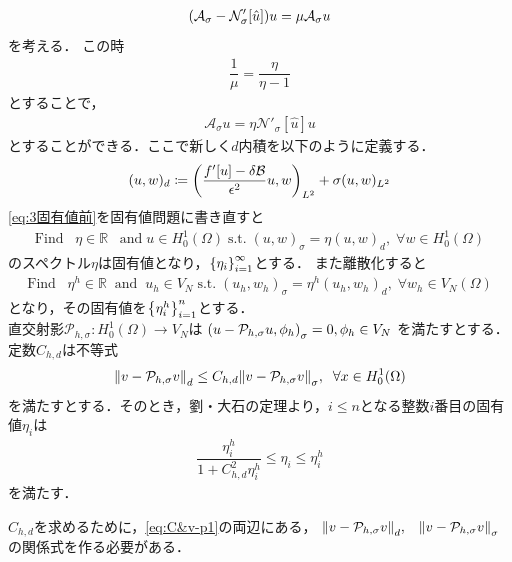 \begin{align}
  \qty(\mathcal{A}_\sigma  - \mathcal{N}'_\sigma  [\hat{u}])u =\mu \mathcal{A}_\sigma  u
\end{align}
を考える．
この時
\begin{align}
  \dfrac{1}{\mu} = \dfrac{\eta}{\eta - 1}
\end{align}
とすることで，
\begin{align}\label{eq:3固有値前}
  \mathcal{A}_\sigma  u = \eta \mathcal{N'}_\sigma [\hat{u}] u 
\end{align}
とすることができる．ここで新しく\(d\)内積を以下のように定義する．
\begin{align}
   (u,w)_d \coloneqq \qty(\dfrac{f'[u]-\delta \mathcal{B}}{\epsilon^2}u,w)_{L^2}+\sigma(u,w)_{L^2}
\end{align}
\eqref{eq:3固有値前}を固有値問題に書き直すと
\begin{align}
  \text{Find} \;\;\;\eta \in \mathbb{R}\;\;\; \text{and} \;u\in H^1_0(\Omega)\;\text{s.t.}\;(u,w)_{\sigma} = \eta (u,w)_d,\;\forall w \in H^1_0 (\Omega)
\end{align}
のスペクトル\(\eta\)は固有値となり，\(\qty{\eta_i}^\infty_{i=1}\)とする．
また離散化すると
\begin{align}
  \text{Find} \;\;\;\eta^h \in \mathbb{R} \;\;\text{and} \;\;u_h\in V_N\;\text{s.t.}\;(u_h,w_h)_{\sigma} = \eta^h (u_h,w_h)_d,\;\forall w_h \in V_N (\Omega)
\end{align}
となり，その固有値を\(\qty{\eta^h_i}^n_{i=1}\)とする．\\
直交射影\(\mathcal{P}_{h,\sigma }:H^1_0(\Omega)\rightarrow V_N\)は
\(\qty(u-\mathcal{P}_{h,\sigma }u , \phi_h)_{\sigma} = 0,\phi_h\in V_N\)
を満たすとする．定数\(C_{h,d }\)は不等式
\begin{align}\label{eq:C&v-p1}
  \norm{v-\mathcal{P}_{h,\sigma }v}_d \leq C_{h,d } \norm{v-\mathcal{P}_{h,\sigma }v}_{\sigma },
  \;\;\forall x \in H^1_0(\Omega)
\end{align}
を満たすとする．そのとき，劉・大石の定理より，\(i \leq n\)となる整数\(i\)番目の固有値\(\eta_i\)は
\begin{align}
  \dfrac{\eta^h_i}{1+C_{h,d}^2\eta^h_i} \leq \eta_i \leq  \eta^h_i
\end{align}
を満たす．

\(C_{h,d}\)を求めるために，\eqref{eq:C&v-p1}の両辺にある，
\(
  \norm{v-\mathcal{P}_{h,\sigma }v}_d ,\;\;\; \norm{v-\mathcal{P}_{h,\sigma }v}_{\sigma }
\)
の関係式を作る必要がある．

